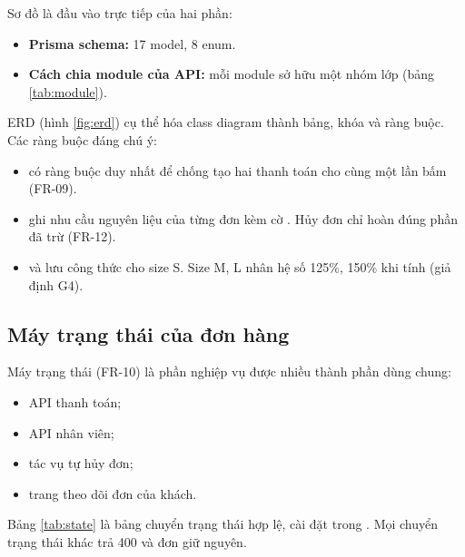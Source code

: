 Sơ đồ là đầu vào trực tiếp của hai phần:
\begin{itemize}
\item \textbf{Prisma schema:} 17 model, 8 enum.
\item \textbf{Cách chia module của API:} mỗi module sở hữu một nhóm lớp (bảng \ref{tab:module}).
\end{itemize}


ERD (hình \ref{fig:erd}) cụ thể hóa class diagram thành bảng, khóa và ràng buộc. Các ràng buộc đáng chú ý:
\begin{itemize}
\item {} có ràng buộc duy nhất  để chống tạo hai thanh toán cho cùng một lần bấm (FR-09).
\item {} ghi nhu cầu nguyên liệu của từng đơn kèm cờ . Hủy đơn chỉ hoàn đúng phần đã trừ (FR-12).
\item {} và  lưu công thức cho size S. Size M, L nhân hệ số 125\%, 150\% khi tính (giả định G4).
\end{itemize}


\subsection{Máy trạng thái của đơn hàng}
Máy trạng thái (FR-10) là phần nghiệp vụ được nhiều thành phần dùng chung:
\begin{itemize}
\item API thanh toán;
\item API nhân viên;
\item tác vụ tự hủy đơn;
\item trang theo dõi đơn của khách.
\end{itemize}

Bảng \ref{tab:state} là bảng chuyển trạng thái hợp lệ, cài đặt trong . Mọi chuyển trạng thái khác trả 400 và đơn giữ nguyên.

